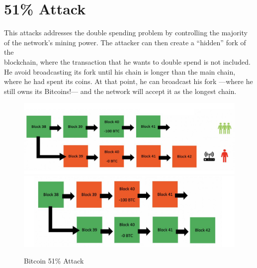 
\newpage
\section{51\% Attack}
\label{sec:51-attack}
\begin{paracol}{2}
   \colfill
   This attacks addresses the double spending problem by controlling the majority of the network's mining power.
   The attacker can then create a ``hidden'' fork of the\\ blockchain,
   where the transaction that he wants to double spend is not included.
   He avoid broadcasting its fork until his chain is longer than the main chain, where he had spent its coins. At that point, he can broadcast his fork ---where he still owns its Bitcoins!--- and the network will accept it as the longest chain.
   \colfill
   \switchcolumn

   \begin{figure}[htbp]
      \centering
      \includegraphics{images/bitcoin_atk511.png}\\
      \includegraphics{images/bitcoin_atk512.png}
      \caption{Bitcoin 51\% Attack}
      \label{fig:bitcoin_atk51}
   \end{figure}
\end{paracol}

